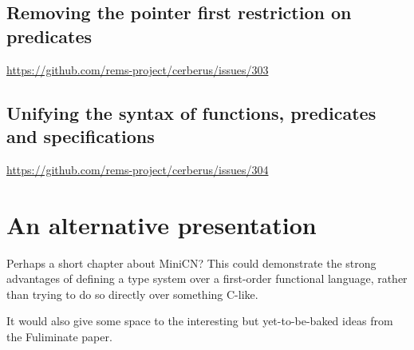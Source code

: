 \section{Removing the pointer first restriction on predicates}
\url{https://github.com/rems-project/cerberus/issues/303}

\section{Unifying the syntax of functions, predicates and specifications}
\url{https://github.com/rems-project/cerberus/issues/304}


\chapter{An alternative presentation}\label{chap:kernel-alternative}

Perhaps a short chapter about MiniCN\@? This could demonstrate the strong
advantages of defining a type system over a first-order functional language,
rather than trying to do so directly over something C-like.

It would also give some space to the interesting but yet-to-be-baked ideas
from the Fuliminate paper.

